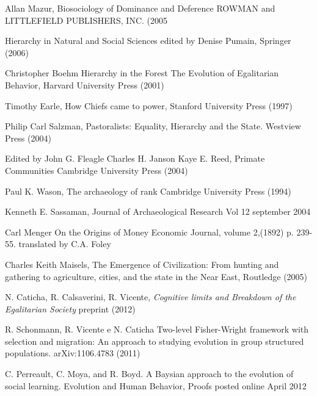 \documentclass[12pt]{article}
\begin{document}
\begin{thebibliography}{30}
 Allan Mazur,
Biosociology
of Dominance
and Deference
ROWMAN and LITTLEFIELD PUBLISHERS, INC.
(2005

Hierarchy in Natural
and Social Sciences
edited by
Denise Pumain, Springer (2006)

Christopher Boehm
Hierarchy in the Forest
The Evolution of
Egalitarian Behavior, Harvard University Press (2001)

 Timothy Earle,
How Chiefs came to power, Stanford University Press (1997)

 Philip Carl Salzman, Pastoralists: Equality, Hierarchy and
the State. Westview Press (2004)


Edited by
John G. Fleagle
Charles H. Janson
Kaye E. Reed, Primate Communities
Cambridge University Press (2004)

 Paul K. Wason, The archaeology of rank
Cambridge University Press (1994)



 Kenneth E. Sassaman, Journal of Archaeological Research Vol 12 september 2004

 Carl Menger
On the Origins of Money
Economic Journal, volume 2,(1892) p. 239-55.
translated by C.A. Foley

Charles Keith Maisels, The Emergence of
Civilization:
From hunting and gathering to
agriculture, cities, and the state in the
Near East,
Routledge   (2005)

 N. Caticha, R. Calsaverini, R. Vicente, {\it
Cognitive limits and Breakdown of the Egalitarian Society} preprint   (2012)

 R. Schonmann, R. Vicente e N. Caticha
Two-level Fisher-Wright framework with selection and migration: An approach to studying evolution in group structured populations.
arXiv:1106.4783 (2011)

C. Perreault, C. Moya, and R. Boyd. A Baysian approach to the evolution of social learning. Evolution and Human Behavior, Proofs posted online April 2012

\end{thebibliography}
\end{document}
